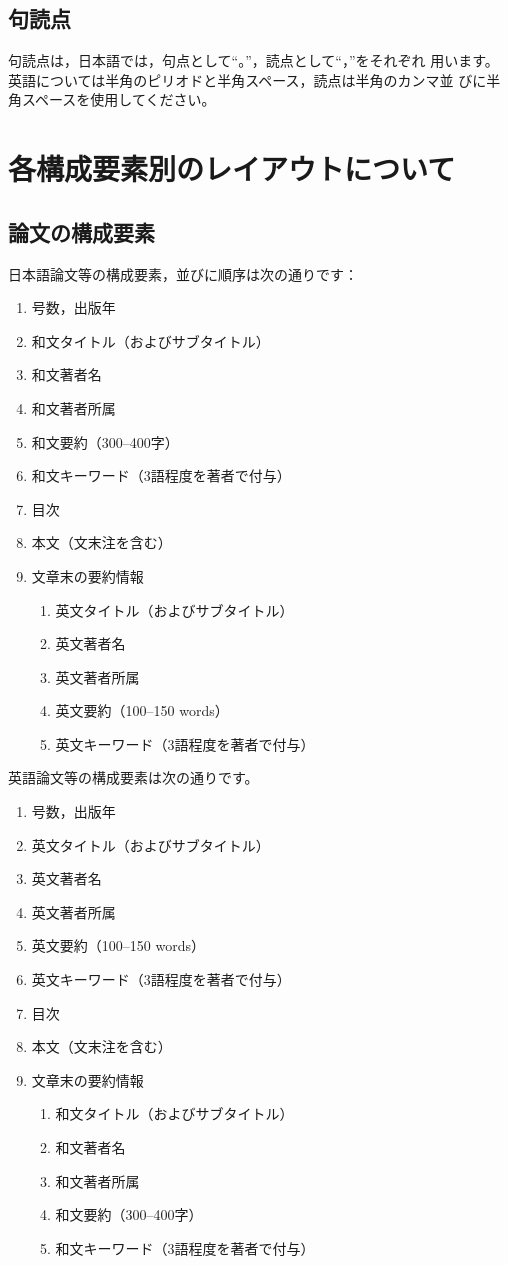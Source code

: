 \documentclass[b5paper,10pt,twocolumn,tombow]{jarticle}
\begin{document}
\subsection{句読点}
句読点は，日本語では，句点として``。''，読点として``，''をそれぞれ
用います。英語については半角のピリオドと半角スペース，読点は半角のカンマ並
びに半角スペースを使用してください。

\section{各構成要素別のレイアウトについて}
\subsection{論文の構成要素}
日本語論文等の構成要素，並びに順序は次の通りです：
\begin{enumerate}
 \item 号数，出版年
 \item 和文タイトル（およびサブタイトル）
 \item 和文著者名
 \item 和文著者所属
 \item 和文要約（300--400字）
 \item 和文キーワード（3語程度を著者で付与）
 \item 目次
 \item 本文（文末注を含む）
 \item 文章末の要約情報
\begin{enumerate}
 \item 英文タイトル（およびサブタイトル）
 \item 英文著者名
 \item 英文著者所属
 \item 英文要約（100--150 words）
 \item 英文キーワード（3語程度を著者で付与）
\end{enumerate}
\end{enumerate}
英語論文等の構成要素は次の通りです。
\begin{enumerate}
 \item 号数，出版年
 \item 英文タイトル（およびサブタイトル）
 \item 英文著者名
 \item 英文著者所属
 \item 英文要約（100--150 words）
 \item 英文キーワード（3語程度を著者で付与）
 \item 目次
 \item 本文（文末注を含む）
 \item 文章末の要約情報
\begin{enumerate}
 \item 和文タイトル（およびサブタイトル）
 \item 和文著者名
 \item 和文著者所属
 \item 和文要約（300--400字）
 \item 和文キーワード（3語程度を著者で付与）
\end{enumerate}
\end{enumerate}
\end{document}
